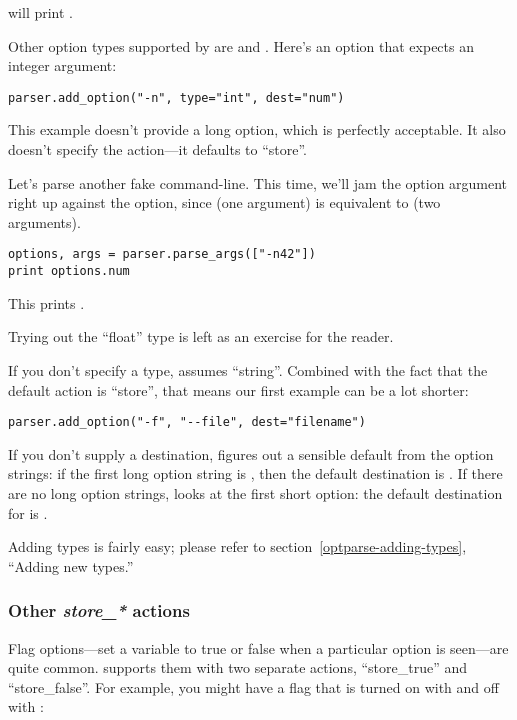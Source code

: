 will print .

Other option types supported by  are  and
.  Here's an option that expects an integer argument:

\begin{verbatim}
parser.add_option("-n", type="int", dest="num")
\end{verbatim}

This example doesn't provide a long option, which is perfectly
acceptable.  It also doesn't specify the action---it defaults to
``store''.
  
Let's parse another fake command-line.  This time, we'll jam the option
argument right up against the option, since  (one
argument) is equivalent to  (two arguments).

\begin{verbatim}
options, args = parser.parse_args(["-n42"])
print options.num
\end{verbatim}

This prints .

Trying out the ``float'' type is left as an exercise for the reader.

If you don't specify a type,  assumes ``string''.
Combined with the fact that the default action is ``store'', that
means our first example can be a lot shorter:

\begin{verbatim}
parser.add_option("-f", "--file", dest="filename")
\end{verbatim}

If you don't supply a destination,  figures out a
sensible default from the option strings: if the first long option
string is , then the default destination is
.  If there are no long option strings,
 looks at the first short option: the default
destination for  is .

Adding types is fairly easy; please refer to
section~\ref{optparse-adding-types}, ``Adding new types.''

\subsubsection{Other \emph{store_*} actions%
               \label{optparse-other-store-actions}}

Flag options---set a variable to true or false when a particular
option is seen---are quite common.   supports them
with two separate actions, ``store_true'' and ``store_false''.  For
example, you might have a  flag that is turned on with
 and off with :

